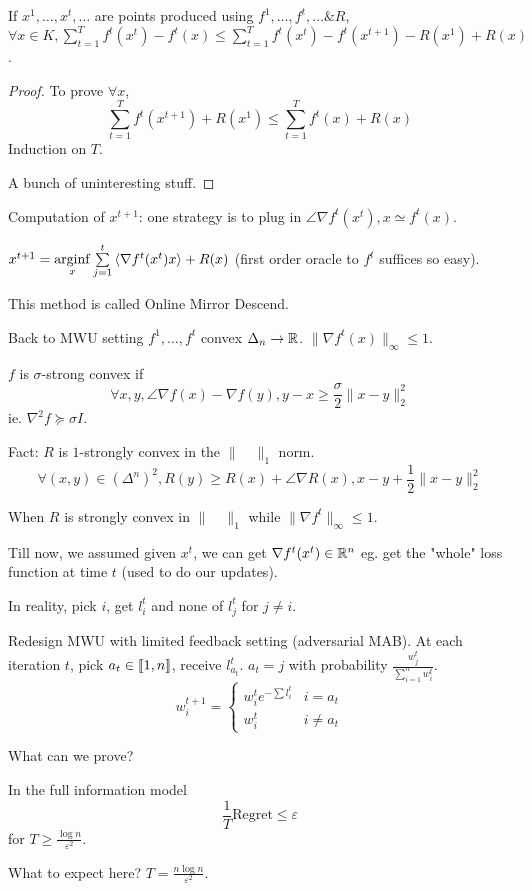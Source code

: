 \begin{theorem}
    If $x^1,\ldots,x^t,\ldots$ are points produced using $f^1,\ldots,f^t,\ldots \& R$, $\forall x \in K, \sum_{t=1}^Tf^t(x^t)-f^t(x) \leqslant \sum\limits_{t=1}^T f^t(x^t) -f^t(x^{t+1}) - R(x^1) + R(x)$. 
\end{theorem}
\begin{proof}
    To prove $\forall x$,
    \[
        \sum\limits_{t=1}^T f^t(x^{t+1}) + R(x^1) \leqslant \sum\limits_{t=1}^T f^t(x) + R(x)
    \]
    Induction on $T$.
    
    A bunch of uninteresting stuff.
\end{proof}

Computation of $x^{t+1}$: one strategy is to plug in $\angle{\nabla f^t(x^t),x} \simeq f^t(x)$.

$x^{t+1} = \underset{x}{\operatorname{arginf}} \sum\limits_{j=1}^t \left\langle \nabla f^t(x^t)x \right\rangle + R(x)$ (first order oracle to $f^t$ suffices so easy).

This method is called Online Mirror Descend.

Back to MWU setting $f^1,\ldots, f^t$ convex $\Delta_n  \to \mathbb{R}$. $\lVert \nabla f^t(x)\rVert_\infty \leqslant 1$.

\begin{definition}
    $f$ is $\sigma$-strong convex if
    \[
        \forall x,y, \angle{\nabla f(x) - \nabla f(y),y-x} \geqslant \frac{\sigma}{2} \lVert x-y \rVert_2^2
    \]
    ie. $\nabla^2 f \succcurlyeq \sigma I$.
\end{definition}

Fact: $R$ is $1$-strongly convex in the $\lVert\quad \rVert_1$ norm.
\[
    \forall (x,y) \in (\Delta^n)^2, R(y) \geqslant R(x) + \angle{\nabla R(x), x-y} + \frac{1}{2} \lVert x-y \rVert_2^2
\]

When $R$ is strongly convex in $\lVert \quad \rVert_1$ while $\lVert \nabla f^t \rVert_{\infty} \leqslant 1$.

Till now, we assumed given $x^t$, we can get $\nabla f^t(x^t) \in \mathbb{R}^n$ eg. get the "whole" loss function at time $t$ (used to do our updates).

In reality, pick $i$, get $l_i^t$ and none of $l_j^t$ for $j\neq i$.

Redesign MWU with limited feedback setting (adversarial MAB). At each iteration $t$, pick $a_t \in \left\llbracket 1, n \right\rrbracket$, receive $l_{a_t}^t$. $a_t = j$ with probability $\frac{w_j^t}{\sum\limits_{i=1}^n w_i^t}$.
\[
    w_i^{t+1} = \begin{cases}
        w_i^t e^{-\sum l_i^t} & i = a_t\\
        w_i^t & i \neq a_t
    \end{cases}
\]

What can we prove?

In the full information model
\[
    \frac{1}{T} \text{Regret} \leqslant \varepsilon
\]
for $T \geqslant \frac{\log n}{\varepsilon^2}$.

What to expect here? $T = \frac{n\log n}{\varepsilon^2}$.